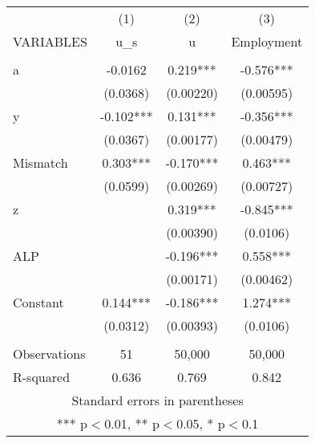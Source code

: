 \documentclass[]{article}
\begin{document}
\begin{tabular}{lccc} \hline
 & (1) & (2) & (3) \\
VARIABLES & u\_s & u & Employment \\ \hline
 &  &  &  \\
a & -0.0162 & 0.219*** & -0.576*** \\
 & (0.0368) & (0.00220) & (0.00595) \\
y & -0.102*** & 0.131*** & -0.356*** \\
 & (0.0367) & (0.00177) & (0.00479) \\
Mismatch & 0.303*** & -0.170*** & 0.463*** \\
 & (0.0599) & (0.00269) & (0.00727) \\
z &  & 0.319*** & -0.845*** \\
 &  & (0.00390) & (0.0106) \\
ALP &  & -0.196*** & 0.558*** \\
 &  & (0.00171) & (0.00462) \\
Constant & 0.144*** & -0.186*** & 1.274*** \\
 & (0.0312) & (0.00393) & (0.0106) \\
 &  &  &  \\
Observations & 51 & 50,000 & 50,000 \\
 R-squared & 0.636 & 0.769 & 0.842 \\ \hline
\multicolumn{4}{c}{ Standard errors in parentheses} \\
\multicolumn{4}{c}{ *** p$<$0.01, ** p$<$0.05, * p$<$0.1} \\
\end{tabular}
\end{document}
